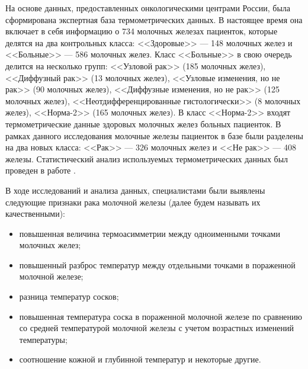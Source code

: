 

На основе данных, предоставленных онкологическими центрами России,
была сформирована экспертная база термометрических данных. В
настоящее время она включает в себя информацию о 734 молочных
железах пациенток, которые делятся на два контрольных класса:
<<Здоровые>> --- 148 молочных желез и <<Больные>> --- 586 молочных
желез. Класс <<Больные>> в свою очередь делится на несколько
групп: <<Узловой рак>> (185 молочных желез), <<Диффузный рак>> (13
молочных желез), <<Узловые изменения, но не рак>> (90 молочных
желез), <<Диффузные изменения, но не рак>> (125 молочных желез),
<<Неотдифференцированные гистологически>> (8 молочных желез),
<<Норма-2>> (165 молочных желез). В класс <<Норма-2>> входят
термометрические данные здоровых молочных желез больных пациенток.
В рамках данного исследования молочные железы пациенток в базе
были разделены на два новых класса: <<Рак>> --- 326 молочных желез и
<<Не рак>> --- 408 железы. Статистический анализ используемых
термометрических данных был проведен в работе \cite{losevmazepa}.



В ходе исследований и анализа данных, специалистами были выявлены следующие признаки рака молочной железы \cite{vaysblat,vesnin,losevzamechnik} (далее будем называть их качественными):
\begin{itemize}
    \item повышенная величина термоасимметрии между одноименными точками молочных желез;
    \item повышенный разброс температур между отдельными точками в пораженной молочной железе;
    \item разница температур сосков;
    \item повышенная температура соска в пораженной молочной железе по сравнению со средней температурой молочной железы с учетом возрастных изменений температуры;
    \item соотношение кожной и глубинной температур и некоторые другие.
\end{itemize}

